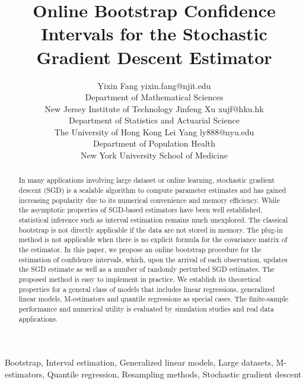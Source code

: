 \documentclass[twoside,11pt]{article}
\begin{document}
\title{Online Bootstrap Confidence Intervals for the Stochastic Gradient Descent Estimator}

\author{\name Yixin Fang \email yixin.fang@njit.edu \\
       \addr Department of Mathematical Sciences\\
       New Jersey Institute of Technology
       \AND
       \name Jinfeng Xu \email xujf@hku.hk \\
       \addr Department of Statistics and Actuarial Science \\
       The University of Hong Kong
       \AND
       \name Lei Yang \email ly888@nyu.edu \\
       \addr Department of Population Health \\
       New York University School of Medicine
       }


\maketitle

\begin{abstract}%
In many applications involving large dataset or online learning, stochastic gradient descent (SGD) is a scalable algorithm to compute parameter estimates and has gained increasing popularity due to its numerical convenience and memory efficiency. While the asymptotic properties of SGD-based estimators have been well established, statistical inference such as interval estimation remains much unexplored.  The classical bootstrap is not directly applicable if the data are not stored in memory. The plug-in method is not applicable when there is no explicit formula for the covariance matrix of the estimator. In this paper, we propose an online bootstrap procedure for the estimation of confidence intervals, which, upon the arrival of each observation, updates the SGD estimate as well as a number of randomly perturbed SGD estimates. The proposed method is easy to implement in practice. We establish its theoretical properties for a general class of models that includes linear regressions, generalized linear models, M-estimators and quantile regressions as special cases. The finite-sample performance and numerical utility is evaluated by simulation studies and real data applications.
\end{abstract}

\begin{keywords}
Bootstrap, Interval estimation, Generalized linear models, Large datasets, M-estimators, Quantile regression, Resampling methods, Stochastic gradient descent
\end{keywords}
\end{document}
